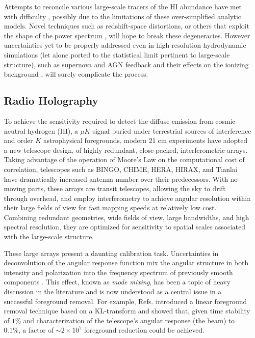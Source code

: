 Attempts to reconcile various large-scale tracers of the HI abundance have met with difficulty \citep{pad2015, castorina2016}, possibly due to the limitations of these over-simplified analytic models. Novel techniques such as redshift-space distortions, or others that exploit the shape of the power spectrum \citep{wolz2017}, will hope to break these degeneracies. However uncertainties yet to be properly addressed even in high resolution hydrodynamic simulations (let alone ported to the statistical limit pertinent to large-scale structure), such as supernova and AGN feedback and their effects on the ionizing background \citep{pontzenbias}, will surely complicate the process. 

\subsection{\label{sec:bg:subsec:hol} Radio Holography}

To achieve the sensitivity required to detect the diffuse emission from cosmic neutral hydrogen (HI), a $\mu K$ signal buried under terrestrial sources of interference and order $K$ astrophysical foregrounds, modern 21 cm experiments have adopted a new telescope design, of highly redundant, close-packed, interferometric arrays. Taking advantage of the operation of Moore's Law on the computational cost of correlation, telescopes such as BINGO, CHIME, HERA, HIRAX, and Tianlai have dramatically increased antenna number over their predecessors. With no moving parts, these arrays are transit telescopes, allowing the sky to drift through overhead, and employ interferometry to achieve angular resolution within their large fields of view for fast mapping speeds at relatively low cost. Combining redundant geometries, wide fields of view, large bandwidths, and high spectral resolution, they are optimized for sensitivity to spatial scales associated with the large-scale structure.

These large arrays present a daunting calibration task. Uncertainties in deconvolution of the angular response function mix the angular structure in both intensity and polarization into the frequency spectrum of previously smooth components \citep{wedge1}. This effect, known as \textit{mode mixing}, has been a topic of heavy discussion in the literature and is now understood as a central issue in a successful foreground removal. For example, Refs. \citep{mmodes1, mmodes2} introduced a linear foreground removal technique based on a KL-transform and showed that, given time stability of $1\%$ and characterization of the telescope's angular response (the beam) to $0.1\%$, a factor of $\sim2\times 10^7$ foreground reduction could be achieved. 

